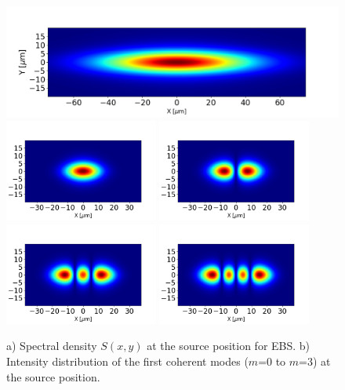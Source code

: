 \documentclass{iucr}              %
\begin{document}
\begin{figure}\label{fig:spectraldensity}
    \centering
        \includegraphics[width=\textwidth]{GRAPHICS/ebs_spectral_density.png}
        \includegraphics[width=0.45\textwidth]{GRAPHICS/ebs_mode0.png}
        \includegraphics[width=0.45\textwidth]{GRAPHICS/ebs_mode1.png}
        \includegraphics[width=0.45\textwidth]{GRAPHICS/ebs_mode2.png}
        \includegraphics[width=0.45\textwidth]{GRAPHICS/ebs_mode3.png}
    \caption{a) Spectral density $S(x,y)$ at the source position for EBS. b) Intensity distribution of the first coherent modes ($m$=0 to $m$=3) at the source position.
    }
\end{figure}
\end{document}

